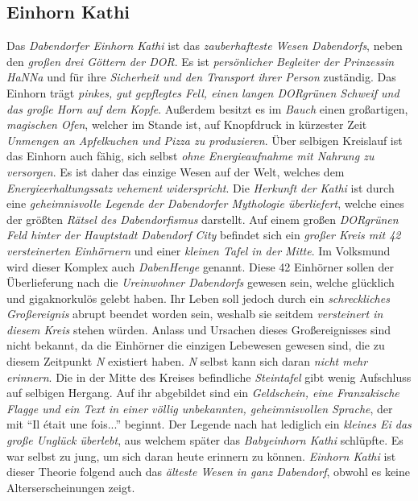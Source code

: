 \subsection{{Einhorn Kathi}}
Das \textit{Dabendorfer Einhorn Kathi} ist das \textit{zauberhafteste Wesen Dabendorfs}, neben den \textit{großen drei Göttern der DOR}. Es ist \textit{persönlicher Begleiter der Prinzessin HaNNa} und für ihre \textit{Sicherheit und den Transport ihrer Person} zuständig. Das Einhorn trägt \textit{pinkes, gut gepflegtes Fell, einen langen DORgrünen Schweif und das große Horn auf dem Kopfe}. Außerdem besitzt es im \textit{Bauch} einen großartigen, \textit{magischen Ofen}, welcher im Stande ist, auf Knopfdruck in kürzester Zeit \textit{Unmengen an Apfelkuchen und Pizza zu produzieren}. Über selbigen Kreislauf ist das Einhorn auch fähig, sich selbst \textit{ohne Energieaufnahme mit Nahrung zu versorgen}. Es ist daher das einzige Wesen auf der Welt, welches dem \textit{Energieerhaltungssatz vehement widerspricht}. Die \textit{Herkunft der Kathi} ist durch eine \textit{geheimnisvolle Legende der Dabendorfer Mythologie überliefert}, welche eines der größten \textit{Rätsel des Dabendorfismus} darstellt. Auf einem großen \textit{DORgrünen Feld hinter der Hauptstadt Dabendorf City} befindet sich ein \textit{großer Kreis mit 42 versteinerten Einhörnern} und einer \textit{kleinen Tafel in der Mitte}. Im Volksmund wird dieser Komplex auch \textit{DabenHenge} genannt. Diese 42 Einhörner sollen der Überlieferung nach die \textit{Ureinwohner Dabendorfs} gewesen sein, welche glücklich und gigaknorkulös gelebt haben. Ihr Leben soll jedoch durch ein \textit{schreckliches Großereignis} abrupt beendet worden sein, weshalb sie seitdem \textit{versteinert in diesem Kreis} stehen würden. Anlass und Ursachen dieses Großereignisses sind nicht bekannt, da die Einhörner die einzigen Lebewesen gewesen sind, die zu diesem Zeitpunkt \textit{N} existiert haben. \textit{N} selbst kann sich daran \textit{nicht mehr erinnern}. Die in der Mitte des Kreises befindliche \textit{Steintafel} gibt wenig Aufschluss auf selbigen Hergang. Auf ihr abgebildet sind ein \textit{Geldschein, eine Franzakische Flagge und ein Text in einer völlig unbekannten, geheimnisvollen Sprache}, der mit \enquote{Il était une fois...} beginnt. Der Legende nach hat lediglich ein \textit{kleines Ei das große Unglück überlebt}, aus welchem später das \textit{Babyeinhorn Kathi} schlüpfte. Es war selbst zu jung, um sich daran heute erinnern zu können. \textit{Einhorn Kathi} ist dieser Theorie folgend auch das \textit{älteste Wesen in ganz Dabendorf}, obwohl es keine Alterserscheinungen zeigt.\\
